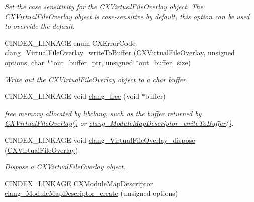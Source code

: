 \begin{DoxyCompactItemize}
\begin{DoxyCompactList}\small\item\em Set the case sensitivity for the {\ttfamily C\+X\+Virtual\+File\+Overlay} object. The {\ttfamily C\+X\+Virtual\+File\+Overlay} object is case-\/sensitive by default, this option can be used to override the default. \end{DoxyCompactList}\item 
C\+I\+N\+D\+E\+X\+\_\+\+L\+I\+N\+K\+A\+GE enum C\+X\+Error\+Code \mbox{\hyperlink{group__BUILD__SYSTEM_ga10434b45b006d39f861d7b2a04d3e31e}{clang\+\_\+\+Virtual\+File\+Overlay\+\_\+write\+To\+Buffer}} (\mbox{\hyperlink{group__BUILD__SYSTEM_gae854e36ceb0a02071e557e19f908772d}{C\+X\+Virtual\+File\+Overlay}}, unsigned options, char $\ast$$\ast$out\+\_\+buffer\+\_\+ptr, unsigned $\ast$out\+\_\+buffer\+\_\+size)
\begin{DoxyCompactList}\small\item\em Write out the {\ttfamily C\+X\+Virtual\+File\+Overlay} object to a char buffer. \end{DoxyCompactList}\item 
C\+I\+N\+D\+E\+X\+\_\+\+L\+I\+N\+K\+A\+GE void \mbox{\hyperlink{group__BUILD__SYSTEM_ga3d7fcaba04ff8fcc4882e1bab6dcbee8}{clang\+\_\+free}} (void $\ast$buffer)
\begin{DoxyCompactList}\small\item\em free memory allocated by libclang, such as the buffer returned by {\ttfamily \mbox{\hyperlink{group__BUILD__SYSTEM_gae854e36ceb0a02071e557e19f908772d}{C\+X\+Virtual\+File\+Overlay()}}} or {\ttfamily \mbox{\hyperlink{group__BUILD__SYSTEM_gacaeaf475a29b16a041641b6ebe9a012d}{clang\+\_\+\+Module\+Map\+Descriptor\+\_\+write\+To\+Buffer()}}}. \end{DoxyCompactList}\item 
\mbox{\label{group__BUILD__SYSTEM_ga118f45b2f96f989fc1f39f3f95973deb}} 
C\+I\+N\+D\+E\+X\+\_\+\+L\+I\+N\+K\+A\+GE void \mbox{\hyperlink{group__BUILD__SYSTEM_ga118f45b2f96f989fc1f39f3f95973deb}{clang\+\_\+\+Virtual\+File\+Overlay\+\_\+dispose}} (\mbox{\hyperlink{group__BUILD__SYSTEM_gae854e36ceb0a02071e557e19f908772d}{C\+X\+Virtual\+File\+Overlay}})
\begin{DoxyCompactList}\small\item\em Dispose a {\ttfamily C\+X\+Virtual\+File\+Overlay} object. \end{DoxyCompactList}\item 
C\+I\+N\+D\+E\+X\+\_\+\+L\+I\+N\+K\+A\+GE \mbox{\hyperlink{group__BUILD__SYSTEM_ga8d7eea7855a8d1118218c7661469b3db}{C\+X\+Module\+Map\+Descriptor}} \mbox{\hyperlink{group__BUILD__SYSTEM_ga41bcb2ce427f6892d48bc21117b22274}{clang\+\_\+\+Module\+Map\+Descriptor\+\_\+create}} (unsigned options)
$$
\end{DoxyCompactItemize}

